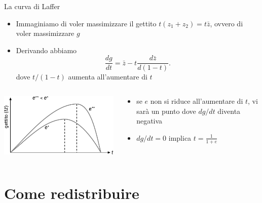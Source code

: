 \documentclass[11pt]{beamer}
\begin{document}
\begin{frame}{La curva di Laffer}
\begin{itemize}
\item Immaginiamo di voler massimizzare il gettito $t(z_1+z_2)=t\bar{z}$, ovvero di voler
massimizzare $g$
\item Derivando abbiamo
\begin{equation*}
  \frac{dg}{dt}=\bar{z}-t\frac{d\bar{z}}{d(1-t)}.
\end{equation*}
dove $t/(1-t)$ aumenta all'aumentare di $t$
\end{itemize}

\begin{columns}
\begin{column}{.45\columnwidth}
\begin{center}
\includegraphics[width=\textwidth]{./figure/laffer-1.pdf}
\end{center}
\end{column}

\begin{column}{.45\columnwidth}
\begin{itemize}
\item se $e$ non si riduce all'aumentare di $t$, vi sarà un punto dove $dg/dt$ diventa negativa
\item $dg/dt=0$ implica $t=\frac{1}{1+e}$
\end{itemize}
\end{column}
\end{columns}
\end{frame}

\section{Come redistribuire}
\end{document}
